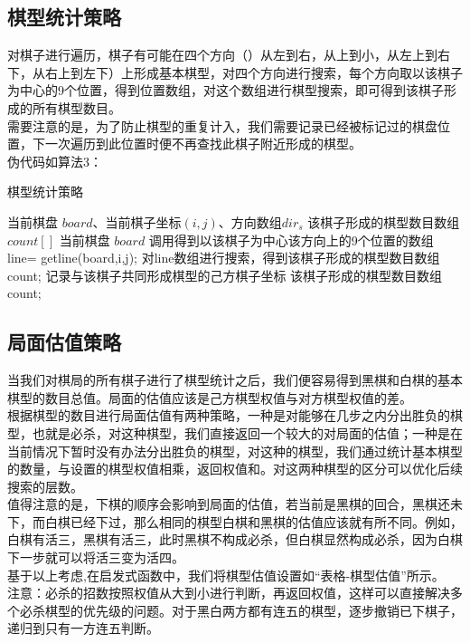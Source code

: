 \documentclass{acm_proc_article-sp}
\begin{document}
\subsection{\textbf{棋型统计策略}}
对棋子进行遍历，棋子有可能在四个方向（）从左到右，从上到小，从左上到右下，从右上到左下）上形成基本棋型，对四个方向进行搜索，每个方向取以该棋子为中心的9个位置，得到位置数组，对这个数组进行棋型搜索，即可得到该棋子形成的所有棋型数目。\\
需要注意的是，为了防止棋型的重复计入，我们需要记录已经被标记过的棋盘位置，下一次遍历到此位置时便不再查找此棋子附近形成的棋型。\\
伪代码如算法3：\\
\begin{tiny}
\begin{algorithm}
       \algsetup{\tiny}
       \scriptsize
	\caption{棋型统计策略}
	\begin{algorithmic}[1] %
		\Require  当前棋盘 $board$、当前棋子坐标$(i,j)$、方向数组$dir_s$
		\Ensure  该棋子形成的棋型数目数组$count[]$ 当前棋盘 $board$
	 	\State 调用得到以该棋子为中心该方向上的9个位置的数组  line= getline(board,i,j);
	 	\State 对line数组进行搜索，得到该棋子形成的棋型数目数组count;
	 	\State
	 	记录与该棋子共同形成棋型的己方棋子坐标
		\EndFor
		\State	\Return 该棋子形成的棋型数目数组count;
		\EndIf
		\EndFunction
	\end{algorithmic}
\end{algorithm}
\end{tiny}

\subsection{\textbf{局面估值策略}}
当我们对棋局的所有棋子进行了棋型统计之后，我们便容易得到黑棋和白棋的基本棋型的数目总值。局面的估值应该是己方棋型权值与对方棋型权值的差。\\
根据棋型的数目进行局面估值有两种策略，一种是对能够在几步之内分出胜负的棋型，也就是必杀，对这种棋型，我们直接返回一个较大的对局面的估值；一种是在当前情况下暂时没有办法分出胜负的棋型，对这种的棋型，我们通过统计基本棋型的数量，与设置的棋型权值相乘，返回权值和。对这两种棋型的区分可以优化后续搜索的层数。\\
值得注意的是，下棋的顺序会影响到局面的估值，若当前是黑棋的回合，黑棋还未下，而白棋已经下过，那么相同的棋型白棋和黑棋的估值应该就有所不同。例如，白棋有活三，黑棋有活三，此时黑棋不构成必杀，但白棋显然构成必杀，因为白棋下一步就可以将活三变为活四。\\
基于以上考虑,在启发式函数中，我们将棋型估值设置如“表格-棋型估值”所示。\\
注意：必杀的招数按照权值从大到小进行判断，再返回权值，这样可以直接解决多个必杀棋型的优先级的问题。对于黑白两方都有连五的棋型，逐步撤销已下棋子，递归到只有一方连五判断。\\
\end{document}
